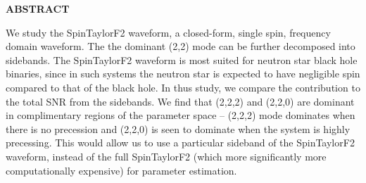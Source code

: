 \documentclass[12pt, a4wide]{report}
\theoremstyle{plain}
\theoremstyle{definition}
\theoremstyle{remark}
\begin{document}








\begin{center}
\textbf{ABSTRACT}\\
\end{center}

We study the SpinTaylorF2 waveform, a closed-form, single spin, frequency 
domain waveform. The the dominant (2,2) mode can be further decomposed 
into sidebands. The SpinTaylorF2 waveform is most suited for neutron star 
black hole binaries, since in such systems the neutron star is expected to 
have negligible spin compared to that of the black hole. In thus study, we 
compare the contribution to the total SNR from the sidebands. We find that 
(2,2,2) and (2,2,0) are dominant in complimentary regions of the parameter 
space -- (2,2,2) mode dominates when there is no precession and (2,2,0) is 
seen to dominate when the system is highly precessing. This would allow us 
to use a particular sideband of the SpinTaylorF2 waveform, instead of the
full SpinTaylorF2 (which more significantly more computationally expensive) 
for parameter estimation. 

\clearpage

\tableofcontents
\clearpage

\newpage

\setcounter{page}{1}









\end{document}
